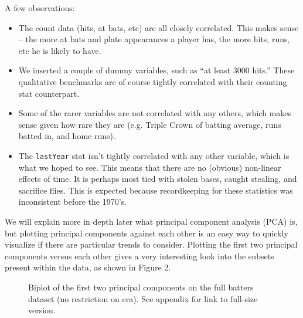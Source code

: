\documentclass[letterpaper, 10 pt, conference]{ieeeconf}
\begin{document}
A few observations:
\begin{itemize}
\item The count data (hits, at bats, etc) are all closely correlated. This makes sense – the more at bats and plate appearances a player has, the more hits, runs, etc he is likely to have. 
\item We inserted a couple of dummy variables, such as “at least 3000 hits.” These qualitative benchmarks are of course tightly correlated with their counting stat counterpart.
\item Some of the rarer variables are not correlated with any others, which makes sense given how rare they are (e.g. Triple Crown of batting average, runs batted in, and home runs).
\item The {{\tt\small lastYear}} stat isn’t tightly correlated with any other variable, which is what we hoped to see. This means that there are no (obvious) non-linear effects of time. It is perhaps most tied with stolen bases, caught stealing, and sacrifice flies. This is expected because  recordkeeping for these statistics was inconsistent before the 1970’s.
\end{itemize}

We will explain more in depth later what principal component analysis (PCA) is, but plotting principal components against each other is an easy way to quickly visualize if there are particular trends to consider. Plotting the first two principal components versus each other gives a very interesting look into the subsets present within the data, as shown in Figure 2.

\begin{figure}[thpb]
\centering
{}
\caption{Biplot of the first two principal components on the full batters dataset (no restriction on era). See appendix for link to full-size version.}
\label{figurelabel}
\end{figure}
\end{document}
